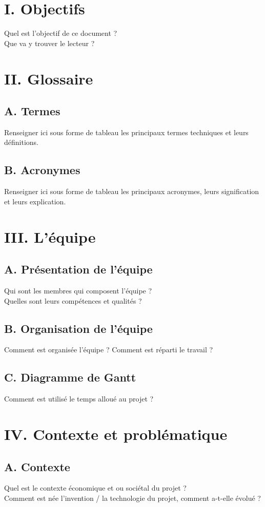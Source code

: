 \documentclass[a4paper,11pt]{book}
\begin{document}
\newpage
\section*{I. Objectifs}
Quel est l’objectif de ce document ?\\
\noindent Que va y trouver le lecteur ?

\newpage
\section*{II. Glossaire}
\subsection*{A. Termes}
Renseigner ici sous forme de tableau les principaux termes techniques et leurs définitions.

\subsection*{B. Acronymes}
Renseigner ici sous forme de tableau les principaux acronymes, leurs signification et leurs explication.

\newpage
\section*{III. L'équipe}
\subsection*{A. Présentation de l'équipe}
Qui sont les membres qui composent l’équipe ?\\
\noindent Quelles sont leurs compétences et qualités ?

\subsection*{B. Organisation de l'équipe}
Comment est organisée l’équipe ? Comment est réparti le travail ?

\subsection*{C. Diagramme de Gantt}
Comment est utilisé le temps alloué au projet ? 

\newpage
\section*{IV. Contexte et problématique}
\subsection*{A. Contexte}
Quel est le contexte économique et ou sociétal du projet ?\\
\noindent Comment est née l’invention / la technologie du projet, comment a-t-elle évolué ?
\end{document}

